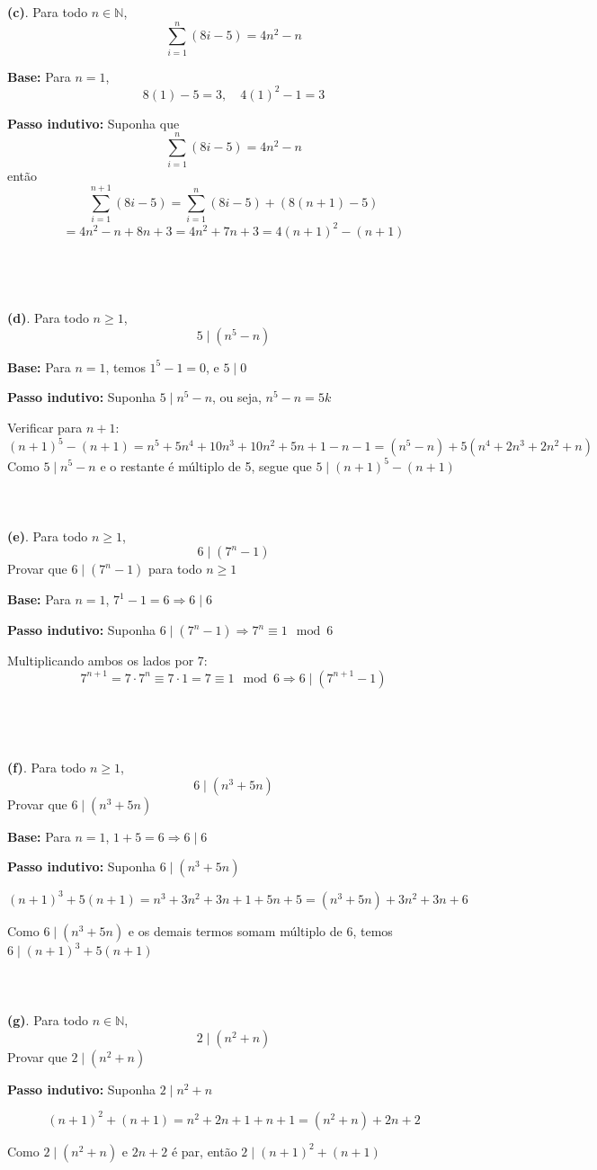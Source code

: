 \documentclass{article}
\begin{document}
\textbf{(c)}. Para todo \( n \in \mathbb{N} \),
\[
\sum_{i=1}^{n} (8i - 5) = 4n^2 - n
\]

\textbf{Base:} Para \( n = 1 \),
\[
8(1) - 5 = 3, \quad 4(1)^2 - 1 = 3
\]

\textbf{Passo indutivo:} Suponha que
\[
\sum_{i=1}^n (8i - 5) = 4n^2 - n
\]
então
\[
\sum_{i=1}^{n+1} (8i - 5) = \sum_{i=1}^n (8i - 5) + (8(n+1) - 5)
\]
\[
= 4n^2 - n + 8n + 3 = 4n^2 + 7n + 3 = 4(n+1)^2 - (n+1)
\]
\\\\
\\\\
\textbf{(d)}. Para todo \( n \geq 1 \),
\[
5 \mid (n^5 - n)
\]

\textbf{Base:} Para \( n = 1 \), temos \( 1^5 - 1 = 0 \), e \( 5 \mid 0 \)

\textbf{Passo indutivo:} Suponha \( 5 \mid n^5 - n \), ou seja, \( n^5 - n = 5k \)

Verificar para \( n+1 \):
\[
(n+1)^5 - (n+1) = n^5 + 5n^4 + 10n^3 + 10n^2 + 5n + 1 - n - 1 = (n^5 - n) + 5(n^4 + 2n^3 + 2n^2 + n)
\]
Como \( 5 \mid n^5 - n \) e o restante é múltiplo de 5, segue que \( 5 \mid (n+1)^5 - (n+1) \)
\\\\
\\\\
\textbf{(e)}. Para todo \( n \geq 1 \),
\[
6 \mid (7^n - 1)
\]
Provar que \( 6 \mid (7^n - 1) \) para todo \( n \geq 1 \)


\textbf{Base:} Para \( n = 1 \), \( 7^1 - 1 = 6 \Rightarrow 6 \mid 6 \)

\textbf{Passo indutivo:} Suponha \( 6 \mid (7^n - 1) \Rightarrow 7^n \equiv 1 \mod 6 \)

Multiplicando ambos os lados por 7:
\[
7^{n+1} = 7 \cdot 7^n \equiv 7 \cdot 1 = 7 \equiv 1 \mod 6
\Rightarrow 6 \mid (7^{n+1} - 1)
\]
\\\\
\\\\
\textbf{(f)}. Para todo \( n \geq 1 \),
\[
6 \mid (n^3 + 5n)
\]
Provar que \( 6 \mid (n^3 + 5n) \)


\textbf{Base:} Para \( n = 1 \), \( 1 + 5 = 6 \Rightarrow 6 \mid 6 \)

\textbf{Passo indutivo:} Suponha \( 6 \mid (n^3 + 5n) \)

\[
(n+1)^3 + 5(n+1) = n^3 + 3n^2 + 3n + 1 + 5n + 5 = (n^3 + 5n) + 3n^2 + 3n + 6
\]

Como \( 6 \mid (n^3 + 5n) \) e os demais termos somam múltiplo de 6, temos \( 6 \mid (n+1)^3 + 5(n+1) \)
\\\\
\\\\
\textbf{(g)}. Para todo \( n \in \mathbb{N} \),
\[
2 \mid (n^2 + n)
\]
Provar que \( 2 \mid (n^2 + n) \)


\textbf{Passo indutivo:} Suponha \( 2 \mid n^2 + n \)

\[
(n+1)^2 + (n+1) = n^2 + 2n + 1 + n + 1 = (n^2 + n) + 2n + 2
\]

Como \( 2 \mid (n^2 + n) \) e \( 2n + 2 \) é par, então \( 2 \mid (n+1)^2 + (n+1) \)
\end{document}
